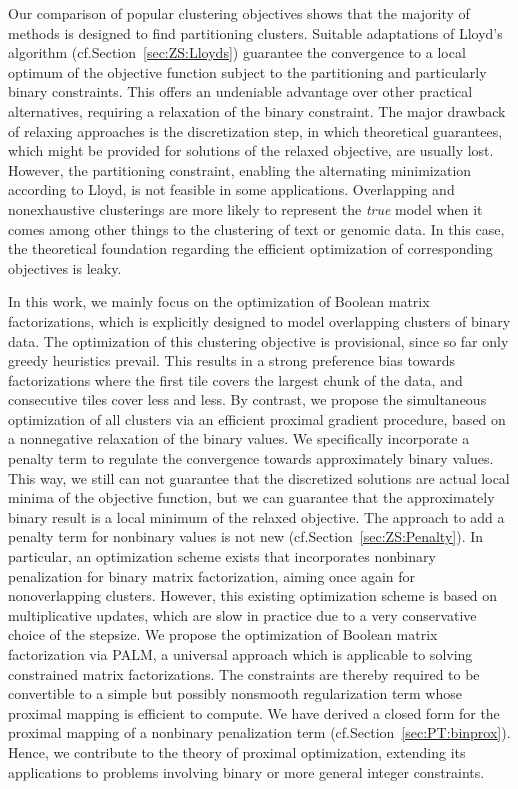 Our comparison of popular clustering objectives shows that the majority of methods is designed to find partitioning clusters. Suitable adaptations of Lloyd's algorithm (cf.\@ Section~\ref{sec:ZS:Lloyds}) guarantee the convergence to a local optimum of the objective function subject to the partitioning and particularly binary constraints. This offers an undeniable advantage over other practical alternatives, requiring a relaxation of the binary constraint. The major drawback of relaxing approaches is the discretization step, in which theoretical guarantees, which might be provided for solutions of the relaxed objective, are usually lost. However, the partitioning constraint, enabling the alternating minimization according to Lloyd, is not feasible in some applications. Overlapping and nonexhaustive clusterings are more likely to represent the \emph{true} model when it comes among other things to the clustering of text or genomic data. In this case, the theoretical foundation regarding the efficient optimization of corresponding objectives is leaky.

In this work, we mainly focus on the optimization of Boolean matrix factorizations, which is explicitly designed to model overlapping clusters of binary data. The optimization of this clustering objective is provisional, since so far only greedy heuristics prevail. This results in a strong preference bias towards factorizations where the first tile covers the largest chunk of the data, and consecutive tiles cover less and less. By contrast, we propose the simultaneous optimization of all clusters via an efficient proximal gradient procedure, based on a nonnegative relaxation of the binary values. We specifically incorporate a penalty term to regulate the convergence towards approximately binary values. This way, we still can not guarantee that the discretized solutions are actual local minima of the objective function, but we can guarantee that the approximately binary result is a local minimum of the relaxed objective. The approach to add a penalty term for nonbinary values is not new (cf.\@ Section~\ref{sec:ZS:Penalty}). In particular, an optimization scheme exists that incorporates nonbinary penalization for binary matrix factorization, aiming once again for nonoverlapping clusters. However, this existing optimization scheme is based on multiplicative updates, which are slow in practice due to a very conservative choice of the stepsize. 
We propose the optimization of Boolean matrix factorization via PALM, a universal approach which is applicable to solving constrained matrix factorizations. The constraints are thereby required to be convertible to a simple but possibly nonsmooth regularization term whose proximal mapping is efficient to compute. We have derived a closed form for the proximal mapping of a nonbinary penalization term (cf.\@ Section~\ref{sec:PT:binprox}). Hence, we contribute to the theory of proximal optimization, extending its applications to problems involving binary or more general integer constraints.

